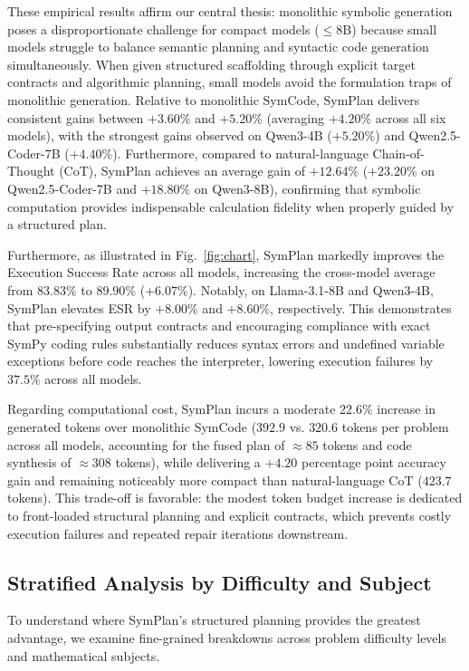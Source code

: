 \documentclass[conference,a4paper]{IEEEtran}
\begin{document}
These empirical results affirm our central thesis: monolithic symbolic generation poses a disproportionate challenge for compact models ($\le 8\text{B}$) because small models struggle to balance semantic planning and syntactic code generation simultaneously. When given structured scaffolding through explicit target contracts and algorithmic planning, small models avoid the formulation traps of monolithic generation. Relative to monolithic SymCode, SymPlan delivers consistent gains between $+3.60\%$ and $+5.20\%$ (averaging $+4.20\%$ across all six models), with the strongest gains observed on Qwen3-4B ($+5.20\%$) and Qwen2.5-Coder-7B ($+4.40\%$). Furthermore, compared to natural-language Chain-of-Thought (CoT), SymPlan achieves an average gain of $+12.64\%$ ($+23.20\%$ on Qwen2.5-Coder-7B and $+18.80\%$ on Qwen3-8B), confirming that symbolic computation provides indispensable calculation fidelity when properly guided by a structured plan.

Furthermore, as illustrated in Fig.~\ref{fig:chart}, SymPlan markedly improves the Execution Success Rate across all models, increasing the cross-model average from $83.83\%$ to $89.90\%$ ($+6.07\%$). Notably, on Llama-3.1-8B and Qwen3-4B, SymPlan elevates ESR by $+8.00\%$ and $+8.60\%$, respectively. This demonstrates that pre-specifying output contracts and encouraging compliance with exact SymPy coding rules substantially reduces syntax errors and undefined variable exceptions before code reaches the interpreter, lowering execution failures by $37.5\%$ across all models.

Regarding computational cost, SymPlan incurs a moderate $22.6\%$ increase in generated tokens over monolithic SymCode ($392.9$ vs. $320.6$ tokens per problem across all models, accounting for the fused plan of $\approx 85$ tokens and code synthesis of $\approx 308$ tokens), while delivering a $+4.20$ percentage point accuracy gain and remaining noticeably more compact than natural-language CoT ($423.7$ tokens). This trade-off is favorable: the modest token budget increase is dedicated to front-loaded structural planning and explicit contracts, which prevents costly execution failures and repeated repair iterations downstream.
\subsection{Stratified Analysis by Difficulty and Subject}

To understand where SymPlan's structured planning provides the greatest advantage, we examine fine-grained breakdowns across problem difficulty levels and mathematical subjects.
\end{document}
